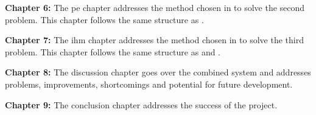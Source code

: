 \textbf{Chapter 6:} The \gls{pe} chapter addresses the method chosen in  to solve the second problem. This chapter follows the same structure as . \medskip

\textbf{Chapter 7:} The \gls{ihm} chapter addresses the method chosen in  to solve the third problem. This chapter follows the same structure as  and . \medskip

\textbf{Chapter 8:} The discussion chapter goes over the combined system and addresses problems, improvements, shortcomings and potential for future development.

\textbf{Chapter 9:} The conclusion chapter addresses the success of the project.


